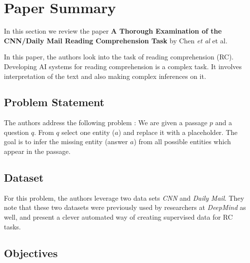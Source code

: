 \section{Paper Summary}
\label{sec:papersummary}

In this section we review the paper \textbf{A Thorough Examination of the CNN/Daily Mail Reading Comprehension Task} by Chen {\it et al} \cite{chen2016thorough} et al.

In this paper, the authors look into the task of reading comprehension (RC). Developing AI systems for reading comprehension is a complex task. It involves interpretation of the text and also making complex inferences on it.

\subsection{Problem Statement}
\label{subsec:problemstatement}

The authors address the following problem : We are given a passage $p$ and a question $q$. From $q$ select one entity ($a$) and replace it with a placeholder. The goal is to infer the missing entity (answer $a$) from all possible entities which appear in the passage. 

\subsection{Dataset}
\label{subsec:dataset}

For this problem, the authors leverage two data sets \textit{CNN} and \textit{Daily Mail}. They note that these two datasets were previously used by researchers at \textit{DeepMind} \cite{hermann2015teaching} as well, and present a clever automated way of creating supervised data for RC tasks.

\subsection{Objectives}
\label{subsec:objectives}

